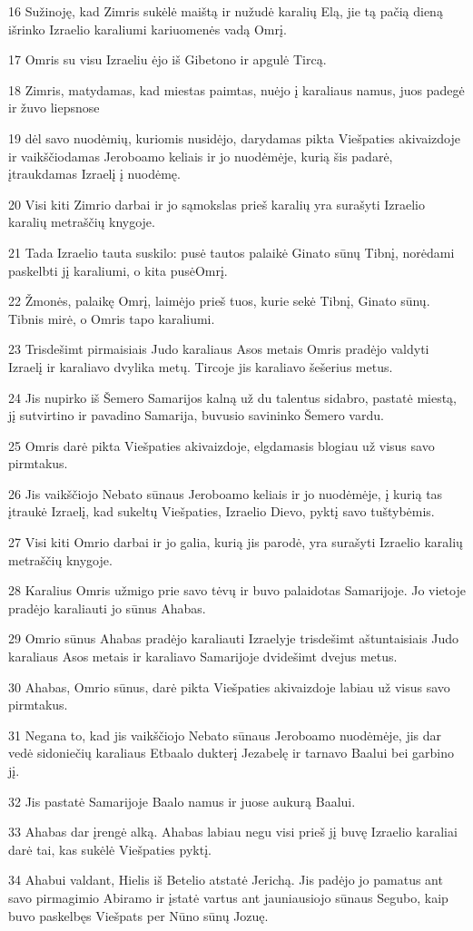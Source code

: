 \par 16 Sužinoję, kad Zimris sukėlė maištą ir nužudė karalių Elą, jie tą pačią dieną išrinko Izraelio karaliumi kariuomenės vadą Omrį. 
\par 17 Omris su visu Izraeliu ėjo iš Gibetono ir apgulė Tircą. 
\par 18 Zimris, matydamas, kad miestas paimtas, nuėjo į karaliaus namus, juos padegė ir žuvo liepsnose 
\par 19 dėl savo nuodėmių, kuriomis nusidėjo, darydamas pikta Viešpaties akivaizdoje ir vaikščiodamas Jeroboamo keliais ir jo nuodėmėje, kurią šis padarė, įtraukdamas Izraelį į nuodėmę. 
\par 20 Visi kiti Zimrio darbai ir jo sąmokslas prieš karalių yra surašyti Izraelio karalių metraščių knygoje. 
\par 21 Tada Izraelio tauta suskilo: pusė tautos palaikė Ginato sūnų Tibnį, norėdami paskelbti jį karaliumi, o kita pusė­Omrį. 
\par 22 Žmonės, palaikę Omrį, laimėjo prieš tuos, kurie sekė Tibnį, Ginato sūnų. Tibnis mirė, o Omris tapo karaliumi. 
\par 23 Trisdešimt pirmaisiais Judo karaliaus Asos metais Omris pradėjo valdyti Izraelį ir karaliavo dvylika metų. Tircoje jis karaliavo šešerius metus. 
\par 24 Jis nupirko iš Šemero Samarijos kalną už du talentus sidabro, pastatė miestą, jį sutvirtino ir pavadino Samarija, buvusio savininko Šemero vardu. 
\par 25 Omris darė pikta Viešpaties akivaizdoje, elgdamasis blogiau už visus savo pirmtakus. 
\par 26 Jis vaikščiojo Nebato sūnaus Jeroboamo keliais ir jo nuodėmėje, į kurią tas įtraukė Izraelį, kad sukeltų Viešpaties, Izraelio Dievo, pyktį savo tuštybėmis. 
\par 27 Visi kiti Omrio darbai ir jo galia, kurią jis parodė, yra surašyti Izraelio karalių metraščių knygoje. 
\par 28 Karalius Omris užmigo prie savo tėvų ir buvo palaidotas Samarijoje. Jo vietoje pradėjo karaliauti jo sūnus Ahabas. 
\par 29 Omrio sūnus Ahabas pradėjo karaliauti Izraelyje trisdešimt aštuntaisiais Judo karaliaus Asos metais ir karaliavo Samarijoje dvidešimt dvejus metus. 
\par 30 Ahabas, Omrio sūnus, darė pikta Viešpaties akivaizdoje labiau už visus savo pirmtakus. 
\par 31 Negana to, kad jis vaikščiojo Nebato sūnaus Jeroboamo nuodėmėje, jis dar vedė sidoniečių karaliaus Etbaalo dukterį Jezabelę ir tarnavo Baalui bei garbino jį. 
\par 32 Jis pastatė Samarijoje Baalo namus ir juose aukurą Baalui. 
\par 33 Ahabas dar įrengė alką. Ahabas labiau negu visi prieš jį buvę Izraelio karaliai darė tai, kas sukėlė Viešpaties pyktį. 
\par 34 Ahabui valdant, Hielis iš Betelio atstatė Jerichą. Jis padėjo jo pamatus ant savo pirmagimio Abiramo ir įstatė vartus ant jauniausiojo sūnaus Segubo, kaip buvo paskelbęs Viešpats per Nūno sūnų Jozuę.



